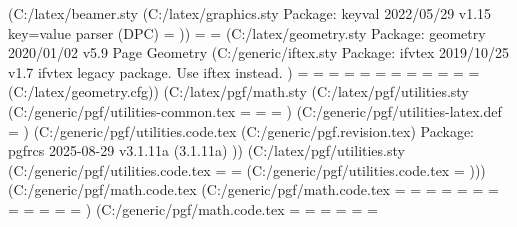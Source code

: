  (C:\Users\SEARS\AppData\Local\Programs\MiKTeX\tex/latex/beamer\beamerbaseoptions.sty (C:\Users\SEARS\AppData\Local\Programs\MiKTeX\tex/latex/graphics\keyval.sty
Package: keyval 2022/05/29 v1.15 key=value parser (DPC)
\KV@toks@=
))
\beamer@paperwidth=
\beamer@paperheight=
 (C:\Users\SEARS\AppData\Local\Programs\MiKTeX\tex/latex/geometry\geometry.sty
Package: geometry 2020/01/02 v5.9 Page Geometry
 (C:\Users\SEARS\AppData\Local\Programs\MiKTeX\tex/generic/iftex\ifvtex.sty
Package: ifvtex 2019/10/25 v1.7 ifvtex legacy package. Use iftex instead.
)
\Gm@cnth=
\Gm@cntv=
\c@Gm@tempcnt=
\Gm@bindingoffset=
\Gm@wd@mp=
\Gm@odd@mp=
\Gm@even@mp=
\Gm@layoutwidth=
\Gm@layoutheight=
\Gm@layouthoffset=
\Gm@layoutvoffset=
\Gm@dimlist=
 (C:\Users\SEARS\AppData\Local\Programs\MiKTeX\tex/latex/geometry\geometry.cfg)) (C:\Users\SEARS\AppData\Local\Programs\MiKTeX\tex/latex/pgf/math\pgfmath.sty (C:\Users\SEARS\AppData\Local\Programs\MiKTeX\tex/latex/pgf/utilities\pgfrcs.sty (C:\Users\SEARS\AppData\Local\Programs\MiKTeX\tex/generic/pgf/utilities\pgfutil-common.tex
\pgfutil@everybye=
\pgfutil@tempdima=
\pgfutil@tempdimb=
) (C:\Users\SEARS\AppData\Local\Programs\MiKTeX\tex/generic/pgf/utilities\pgfutil-latex.def
\pgfutil@abb=
) (C:\Users\SEARS\AppData\Local\Programs\MiKTeX\tex/generic/pgf/utilities\pgfrcs.code.tex (C:\Users\SEARS\AppData\Local\Programs\MiKTeX\tex/generic/pgf\pgf.revision.tex)
Package: pgfrcs 2025-08-29 v3.1.11a (3.1.11a)
)) (C:\Users\SEARS\AppData\Local\Programs\MiKTeX\tex/latex/pgf/utilities\pgfkeys.sty (C:\Users\SEARS\AppData\Local\Programs\MiKTeX\tex/generic/pgf/utilities\pgfkeys.code.tex
\pgfkeys@pathtoks=
\pgfkeys@temptoks=
 (C:\Users\SEARS\AppData\Local\Programs\MiKTeX\tex/generic/pgf/utilities\pgfkeyslibraryfiltered.code.tex
\pgfkeys@tmptoks=
))) (C:\Users\SEARS\AppData\Local\Programs\MiKTeX\tex/generic/pgf/math\pgfmath.code.tex (C:\Users\SEARS\AppData\Local\Programs\MiKTeX\tex/generic/pgf/math\pgfmathutil.code.tex
\pgf@x=
\pgf@xa=
\pgf@xb=
\pgf@xc=
\pgf@y=
\pgf@ya=
\pgf@yb=
\pgf@yc=
\c@pgf@counta=
\c@pgf@countb=
\c@pgf@countc=
\c@pgf@countd=
) (C:\Users\SEARS\AppData\Local\Programs\MiKTeX\tex/generic/pgf/math\pgfmathparser.code.tex
\pgfmath@dimen=
\pgfmath@count=
\pgfmath@box=
\pgfmath@toks=
\pgfmath@stack@operand=
\pgfmath@stack@operation=
